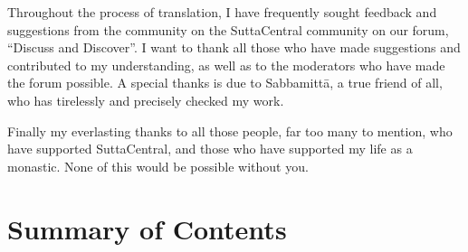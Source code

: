 \documentclass[12pt,openany]{book}%
\begin{document}
Throughout the process of translation, I have frequently sought feedback and suggestions from the community on the SuttaCentral community on our forum, “Discuss and Discover”. I want to thank all those who have made suggestions and contributed to my understanding, as well as to the moderators who have made the forum possible. A special thanks is due to \textsanskrit{Sabbamittā}, a true friend of all, who has tirelessly and precisely checked my work.

Finally my everlasting thanks to all those people, far too many to mention, who have supported SuttaCentral, and those who have supported my life as a monastic. None of this would be possible without you.

%
\chapter*{Summary of Contents}
\end{document}
